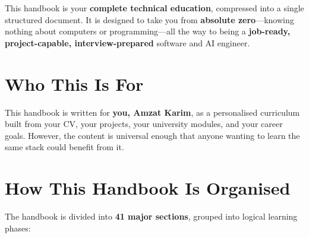 \documentclass[12pt, a4paper, oneside]{book}
\begin{document}
This handbook is your \textbf{complete technical education}, compressed into a single structured document. It is designed to take you from \textbf{absolute zero}---knowing nothing about computers or programming---all the way to being a \textbf{job-ready, project-capable, interview-prepared} software and AI engineer.

\section*{Who This Is For}

This handbook is written for \textbf{you, Amzat Karim}, as a personalised curriculum built from your CV, your projects, your university modules, and your career goals. However, the content is universal enough that anyone wanting to learn the same stack could benefit from it.

\section*{How This Handbook Is Organised}

The handbook is divided into \textbf{41 major sections}, grouped into logical learning phases:
\end{document}
